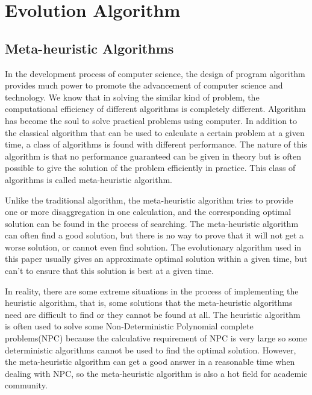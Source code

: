 
\section{Evolution Algorithm}

\subsection{Meta-heuristic Algorithms}
%
In the development process of computer science, the design of program 
algorithm provides much power to promote the advancement of computer science 
and technology. We know that in solving the similar kind of problem, the 
computational efficiency of different algorithms is completely different. 
Algorithm has become the soul to solve practical problems using computer. In 
addition to the classical algorithm that can be used to calculate a certain 
problem at a given time, a class of algorithms is found with different 
performance. The nature of this algorithm is that no performance guaranteed 
can be given in theory but is often possible to give the solution of the 
problem efficiently in practice. This class of algorithms is called meta-heuristic algorithm.

Unlike the traditional algorithm, the meta-heuristic algorithm tries to 
provide one or more disaggregation in one calculation, and the corresponding 
optimal solution can be found in the process of searching. The meta-heuristic 
algorithm can often find a good solution, but there is no way to prove that 
it will not get a worse solution, or cannot even find solution. The 
evolutionary algorithm used in this paper usually gives an approximate 
optimal solution within a given time, but can’t to ensure that this solution 
is best at a given time.

In reality, there are some extreme situations in the process of implementing 
the heuristic algorithm, that is, some solutions that the meta-heuristic 
algorithms need are difficult to find or they cannot be found at all. The 
heuristic algorithm is often used to solve some Non-Deterministic Polynomial 
complete problems(NPC) because the calculative requirement of NPC is very 
large so some deterministic algorithms cannot be used to find the optimal 
solution. However, the meta-heuristic algorithm can get a good answer in a 
reasonable time when dealing with NPC, so the meta-heuristic algorithm is 
also a hot field for academic community.

